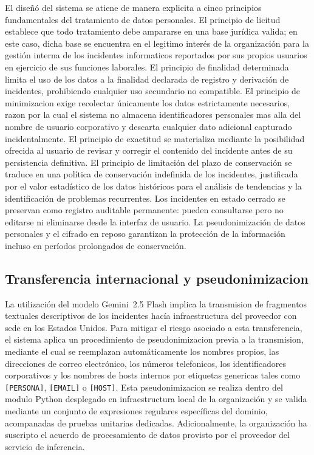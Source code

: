 El diseñó del sistema se atiene de manera explicita a cinco principios fundamentales del tratamiento de datos personales. El principio de licitud establece que todo tratamiento debe ampararse en una base jurídica valida; en este caso, dicha base se encuentra en el legitimo interés de la organización para la gestión interna de los incidentes informaticos reportados por sus propios usuarios en ejercicio de sus funciones laborales. El principio de finalidad determinada limita el uso de los datos a la finalidad declarada de registro y derivación de incidentes, prohibiendo cualquier uso secundario no compatible. El principio de minimizacion exige recolectar únicamente los datos estrictamente necesarios, razon por la cual el sistema no almacena identificadores personales mas alla del nombre de usuario corporativo y descarta cualquier dato adicional capturado incidentalmente. El principio de exactitud se materializa mediante la posibilidad ofrecida al usuario de revisar y corregir el contenido del incidente antes de su persistencia definitiva. El principio de limitación del plazo de conservación se traduce en una política de conservación indefinida de los incidentes, justificada por el valor estadístico de los datos históricos para el análisis de tendencias y la identificación de problemas recurrentes. Los incidentes en estado cerrado se preservan como registro auditable permanente: pueden consultarse pero no editarse ni eliminarse desde la interfaz de usuario. La pseudonimización de datos personales y el cifrado en reposo garantizan la protección de la información incluso en períodos prolongados de conservación.

\subsection{Transferencia internacional y pseudonimizacion}

La utilización del modelo Gemini~2.5 Flash implica la transmision de fragmentos textuales descriptivos de los incidentes hacía infraestructura del proveedor con sede en los Estados Unidos. Para mitigar el riesgo asociado a esta transferencia, el sistema aplica un procedimiento de pseudonimizacion previa a la transmision, mediante el cual se reemplazan automáticamente los nombres propios, las direcciones de correo electrónico, los números telefonicos, los identificadores corporativos y los nombres de hosts internos por etiquetas genericas tales como \texttt{[PERSONA]}, \texttt{[EMAIL]} o \texttt{[HOST]}. Esta pseudonimizacion se realiza dentro del modulo Python desplegado en infraestructura local de la organización y se valida mediante un conjunto de expresiones regulares específicas del dominio, acompanadas de pruebas unitarias dedicadas. Adicionalmente, la organización ha suscripto el acuerdo de procesamiento de datos provisto por el proveedor del servicio de inferencia.

